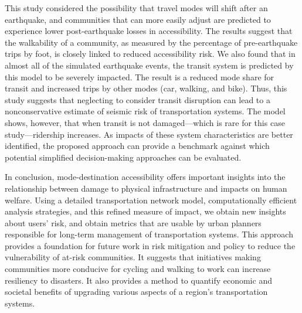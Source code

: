 This study considered the possibility that travel modes will shift after an earthquake, and communities that can more easily adjust are predicted to experience lower post-earthquake losses in accessibility. The results suggest that the walkability of a community, as measured by the percentage of pre-earthquake trips by foot, is closely linked to reduced accessibility risk. 
We also found that in almost all of the simulated earthquake events, the transit system is predicted by this model to be severely impacted. The result is a reduced mode share for transit and increased trips by other modes (car, walking, and bike). Thus, this study suggests that neglecting to consider transit disruption can lead to a nonconservative estimate of seismic risk of transportation systems. The model shows, however, that when transit is not damaged---which is rare for this case study---ridership increases. As impacts of these system characteristics are better identified, the proposed approach can provide a benchmark against which potential simplified decision-making approaches can be evaluated.

In conclusion,  mode-destination accessibility offers important insights into the relationship between damage to physical infrastructure and impacts on human welfare. 
Using a detailed transportation network model, computationally efficient analysis strategies, and this refined measure of impact, we obtain new insights about users' risk, and obtain metrics that are usable by urban planners responsible for long-term management of  transportation systems.
This approach provides a foundation for future work in risk mitigation and policy to reduce the vulnerability of at-risk communities. It  suggests that initiatives making communities more conducive for cycling and walking to work can increase resiliency to disasters. It also provides a method to quantify economic and societal benefits of upgrading various aspects of a region's transportation systems.

